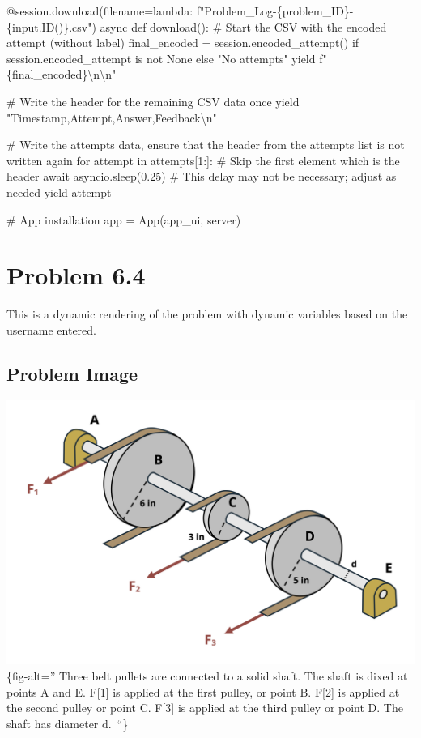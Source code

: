 \documentclass[
  letterpaper,
  DIV=11,
  numbers=noendperiod]{scrreprt}
\newenvironment{Shaded}{\begin{snugshade}}{\end{snugshade}}
\newcommand{\NormalTok}[1]{\textcolor[rgb]{0.00,0.23,0.31}{#1}}
\begin{document}
\begin{Shaded}
\begin{Highlighting}[]
\NormalTok{    @session.download(filename=lambda: f"Problem\_Log{-}\{problem\_ID\}{-}\{input.ID()\}.csv")}
\NormalTok{    async def download():}
\NormalTok{        \# Start the CSV with the encoded attempt (without label)}
\NormalTok{        final\_encoded = session.encoded\_attempt() if session.encoded\_attempt is not None else "No attempts"}
\NormalTok{        yield f"\{final\_encoded\}\textbackslash{}n\textbackslash{}n"}
        
\NormalTok{        \# Write the header for the remaining CSV data once}
\NormalTok{        yield "Timestamp,Attempt,Answer,Feedback\textbackslash{}n"}
        
\NormalTok{        \# Write the attempts data, ensure that the header from the attempts list is not written again}
\NormalTok{        for attempt in attempts[1:]:  \# Skip the first element which is the header}
\NormalTok{            await asyncio.sleep(0.25)  \# This delay may not be necessary; adjust as needed}
\NormalTok{            yield attempt}


\NormalTok{\# App installation}
\NormalTok{app = App(app\_ui, server)}
\end{Highlighting}
\end{Shaded}

\chapter*{Problem 6.4}\label{problem-6.4}


This is a dynamic rendering of the problem with dynamic variables based
on the username entered.

\section*{Problem Image}\label{problem-image-47}


\includegraphics{images/276.png}\{fig-alt='' Three belt pullets are
connected to a solid shaft. The shaft is dixed at points A and E.
F{[}1{]} is applied at the first pulley, or point B. F{[}2{]} is applied
at the second pulley or point C. F{[}3{]} is applied at the third pulley
or point D. The shaft has diameter d.~``\}
\end{document}
